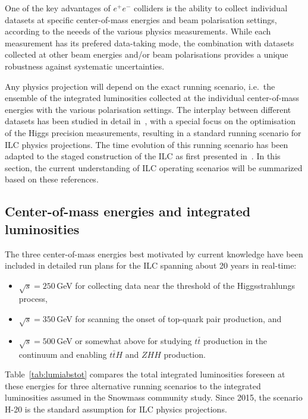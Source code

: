

One of the key advantages of $e^+e^-$ colliders is the ability to collect individual datasets at specific center-of-mass energies and beam polarisation settings, according to the neeeds of the various physics measurements.
While each measurement has its prefered data-taking mode, the combination with datasets collected at other beam energies and/or beam polarisations provides a unique robustness against systematic uncertainties.

Any physics projection will depend on the exact running scenario, i.e.\ the ensemble of the integrated luminosities collected at the individual center-of-mass energies with the various polarisation settings. The interplay between different datasets has been studied in detail in~\cite{Barklow:2015tja}, with a special focus on the optimisation of the Higgs precision measurements, resulting in a standard running scenario for ILC physics projections. The time evolution of this running scenario has been adapted to the staged construction of the ILC as first presented in~\cite{Fujii:2017vwa}. In this section,
the current understanding of ILC operating scenarios will be summarized based on these references.  


\subsection{Center-of-mass energies and integrated luminosities}
The three center-of-mass energies best motivated by current knowledge have been included in detailed run plans for the ILC spanning about 20 years in real-time:
\begin{itemize}
\item $\sqrt{s}=250$\,GeV for collecting data near the threshold of the Higgsstrahlungs process, 
\item $\sqrt{s}=350$\,GeV for scanning the onset of top-quark pair production, and 
\item $\sqrt{s}=500$\,GeV or somewhat above for studying $t\bar{t}$ production in the continuum and enabling $t\bar{t}H$ and $ZHH$ production. 
\end{itemize}
Table~\ref{tab:lumiabstot} compares the total integrated luminosities foreseen at these energies for three alternative running scenarios to the integrated luminosities assumed in the Snowmass community study. Since 2015, the scenario H-20 is the standard assumption
for ILC physics projections.

